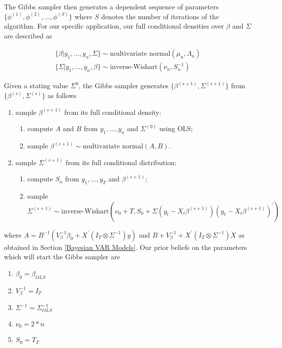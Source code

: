 \documentclass[12pt]{article}
\begin{document}
The Gibbs sampler then generates a dependent sequence of parameters $\{\phi^{(1)} , \phi^{(2)} ,...,\phi^{(S)}\}$ where $S$ denotes the number of iterations of the algorithm. For our specific application, our full conditional densities over $\beta$ and $\Sigma$ are described as

\begin{equation}
\begin{split}
   \{\beta|y_{1},...,y_{n},\Sigma\}\sim \text{multivariate normal}(\mu_{n},\Lambda_{n}) \\
   \{\Sigma|y_{1},...,y_{n},\beta\}\sim \text{inverse-Wishart}(\nu_{n},S^{-1}_{n})
   \end{split}
\end{equation}

Given a stating value $\Sigma^{0}$, the Gibbs sampler generates $\{\beta^{(s+1)},\Sigma^{(s+1)}\}$ from $\{\beta^{(s)},\Sigma^{(s)}\}$ as follows

\begin{enumerate}
  \item sample $\beta^{(s+1)}$ from its full conditional density:
  \begin{enumerate}
      \item compute $A$ and $B$ from $y_{1},...,y_{n}$ and $\Sigma^{(0)}$ using OLS;
      \item sample $\beta^{(s+1)} \sim \text{multivariate normal}(A,B)$.
  \end{enumerate}
  \item sample ${\Sigma}^{(s+1)}$ from its full conditional distribution:
  \begin{enumerate}
      \item compute $S_{n}$ from $y_{1},...,y_{T}$ and $\beta^{(s+1)}$;
      \item sample ${\Sigma}^{(s+1)} \sim \text{inverse-Wishart}(\nu_{0}+T, S_{0}+\Sigma(y_{t}-X_{t}\beta^{(s+1)})(y_{t}-X_{t}\beta^{(s+1)})^{'})$
  \end{enumerate}
  
\end{enumerate}

where $A=B^{-1}(V_{\beta}^{-1}\beta_{0}+X^{'}(I_{T}\otimes \Sigma^{-1})y)$ and $B+V_{\beta}^{-1}+X^{'}(I_{T}\otimes \Sigma^{-1})X$ as obtained in Section \ref{Bayesian VAR Models}. Our prior beliefs on the parameters which will start the Gibbs sampler are

\begin{enumerate}
    \item $\beta_{0} = \beta_{OLS}$
    \item $V_{\beta}^{-1} = I_{T}$
    \item $\Sigma^{-1} = \Sigma^{-1}_{OLS}$
    \item $\nu_{0}=2*n$
    \item $S_{0} = T_{T}$
\end{enumerate}
\end{document}
